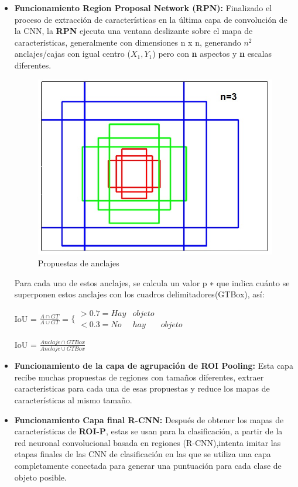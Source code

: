 \begin{itemize}
    \item \textbf{Funcionamiento Region Proposal Network (RPN):} Finalizado el proceso de extracción de características en la última capa de convolución de la CNN, la \textbf{RPN} ejecuta una ventana deslizante sobre el mapa de características, generalmente con dimensiones n x n, generando $n^2$ anclajes/cajas con igual centro ($X_1, Y_1$) pero con \textbf{n} aspectos y \textbf{n} escalas diferentes. 
    
    \begin{figure}[H]
    \centering
    \includegraphics[width=.6\linewidth]{imagenes/anclajes.jpg}
    \caption{Propuestas de anclajes}
    \label{fig:Anclajes}
\end{figure}
    
    Para cada uno de estos anclajes, se calcula un valor p ∗ que indica cuánto se superponen estos anclajes con los cuadros delimitadores(GTBox), así:
    
    IoU = $\frac{A\cap GT}{A \cup GT}$ = $\bigl\{\begin{array}{ccc}
    > 0.7 = Hay & objeto & \\
    < 0.3 = No & hay & objeto
\end{array}$ 
    
IoU = $ \frac{Anclaje \cap GTBox}{Anclaje \cup GTBox}  $
    
    \item \textbf{Funcionamiento de la capa de agrupación de ROI Pooling:} Esta capa recibe muchas propuestas de regiones con tamaños diferentes, extraer características para cada una de esas propuestas  y reduce los mapas de características al mismo tamaño.
    \item \textbf{Funcionamiento Capa final R-CNN:} Después de obtener los mapas de características de \textbf{ROI-P}, estas se usan para la clasificación, a partir de la red neuronal convolucional basada en regiones (R-CNN),intenta imitar las etapas finales de las CNN de clasificación en las que se utiliza una capa completamente conectada para generar una puntuación para cada clase de objeto posible.
\end{itemize}


